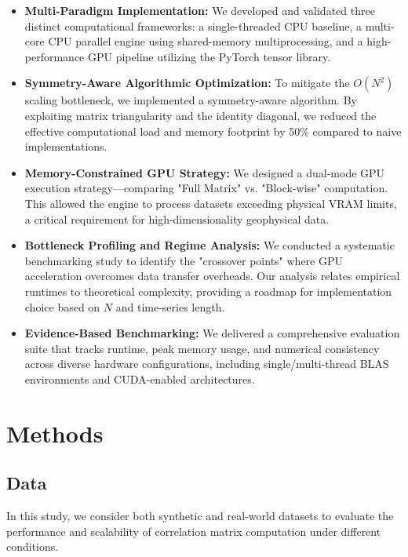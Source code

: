 \begin{itemize}
    \item \textbf{Multi-Paradigm Implementation:} We developed and validated three distinct computational frameworks: a single-threaded CPU baseline, a multi-core CPU parallel engine using shared-memory multiprocessing, and a high-performance GPU pipeline utilizing the PyTorch tensor library.
    
    \item \textbf{Symmetry-Aware Algorithmic Optimization:} To mitigate the $O(N^2)$ scaling bottleneck, we implemented a symmetry-aware algorithm. By exploiting matrix triangularity and the identity diagonal, we reduced the effective computational load and memory footprint by 50\% compared to naive implementations.
    
    \item \textbf{Memory-Constrained GPU Strategy:} We designed a dual-mode GPU execution strategy—comparing "Full Matrix" vs. "Block-wise" computation. This allowed the engine to process datasets exceeding physical VRAM limits, a critical requirement for high-dimensionality geophysical data.
    
    \item \textbf{Bottleneck Profiling and Regime Analysis:} We conducted a systematic benchmarking study to identify the "crossover points" where GPU acceleration overcomes data transfer overheads. Our analysis relates empirical runtimes to theoretical complexity, providing a roadmap for implementation choice based on $N$ and time-series length.
    
    \item \textbf{Evidence-Based Benchmarking:} We delivered a comprehensive evaluation suite that tracks runtime, peak memory usage, and numerical consistency across diverse hardware configurations, including single/multi-thread BLAS environments and CUDA-enabled architectures.
\end{itemize}

\section{Methods}

\subsection{Data}

In this study, we consider both synthetic and real-world datasets to evaluate the performance and scalability of correlation matrix computation under different conditions.

